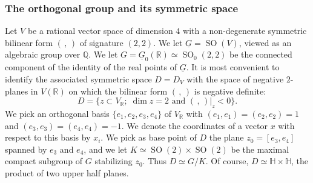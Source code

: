 \documentclass[12pt,leqno]{amsart}
\numberwithin{equation}{section}
\theoremstyle{plain}
\theoremstyle{definition}
\theoremstyle{remark}
\newcommand{\R}{\mathbb{R}}
\newcommand{\Q}{\mathbb{Q}}
\newcommand{\h}{\mathbb{H}}
\renewcommand{\H}{\mathbb{H}}
\newcommand{\SO}{\operatorname{SO}}
\begin{document}
\subsubsection{The orthogonal group and its symmetric space}


Let $V$ be a rational vector space of dimension $4$ with a
non-degenerate symmetric bilinear form  $(\,,\,)$ of signature
$(2,2)$.
We let $\underline{G} = \SO(V)$, viewed as an algebraic group over $\Q$.
We let $G=\underline{G}_0(\R) \simeq \SO_0(2,2)$ be the connected component of the identity of the real points of $\underline{G}$.
It is most convenient to identify the associated symmetric space $D= D_V$ with the
space of negative $2$-planes in $V(\R)$ on which the bilinear form $(\,,\,)$ is
negative definite:
\[
D = \{z \subset V_{\R} ; \;\text{$\dim z =2$ and $(\,,\,)|_z < 0$}
\}.
\]
We pick an orthogonal basis $\{e_1,e_2,e_3,e_4\}$ of $V_{\R}$ with $(e_1,e_1)=(e_2,e_2)=1$ and $(e_3,e_3)=(e_4,e_4)=-1$. We denote the coordinates of a vector $x$ with respect to this basis by $x_i$. We pick as base point of $D$ the plane $z_0=[e_3,e_4]$ spanned by $e_3$ and $e_4$, and we let $K \simeq \SO(2)\times \SO(2)$ be the maximal compact subgroup of $G$ stabilizing $z_0$. Thus $D \simeq G/K$. Of course, $D \simeq \H \times \h$, the product of two upper half planes. 
\end{document}
